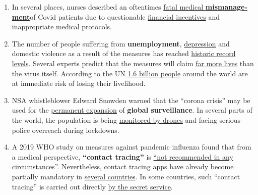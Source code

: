 \begin{enumerate}
{  seasons}, but many studies of a \textbf{``second wave''} are based on
  \href{https://www.heise.de/tp/features/Fellay-Studie-Zweite-Corona-Welle-4726303.html}{very
  unrealistic assumptions}, such as a constant risk of illness and death
  across all age groups.
\item
  In several places, nurses described an oftentimes
  \href{https://www.youtube.com/watch?v=UIDsKdeFOmQ}{fatal medical
  \textbf{mis­manage­ment}}of Covid patients due to questionable
  \href{https://www.usatoday.com/story/news/factcheck/2020/04/24/fact-check-medicare-hospitals-paid-more-covid-19-patients-coronavirus/3000638001/}{financial
  incentives} and inappropriate medical protocols.
\item
  The number of people suffering from \textbf{unemployment},
  \href{https://www.indystar.com/story/news/health/2020/04/03/coronavirus-indiana-how-get-help-mental-health-addiction/5104357002/}{depression}
  and domestic violence as a result of the measures has reached
  \href{https://www.businessinsider.com/us-weekly-jobless-claims-unemployment-filings-coronavirus-labor-market-layoffs-2020-5}{historic
  record levels}. Several experts predict that the measures will claim
  \href{https://www.nytimes.com/2020/03/20/opinion/coronavirus-pandemic-social-distancing.html}{far
  more lives} than the virus itself. According to the UN
  \href{https://www.theguardian.com/world/2020/apr/29/half-of-worlds-workers-at-immediate-risk-of-losing-livelihood-due-to-coronavirus}{1.6
  billion people} around the world are at immediate risk of losing their
  livelihood.
\item
  NSA whistleblower Edward Snowden warned that the ``corona crisis'' may
  be used for the
  \href{https://www.youtube.com/watch?v=-pcQFTzck_c}{permanent
  expansion} of \textbf{global surveillance}. In several parts of the
  world, the population is being
  \href{https://off-guardian.org/2020/04/25/50-headlines-darker-more-of-the-new-normal/}{monitored
  by drones} and facing serious police overreach during lockdowns.
\item
  A 2019 WHO study on measures against pandemic influenza found that
  from a medical perspective, \textbf{``contact tracing''} is
  \href{https://apps.who.int/iris/bitstream/handle/10665/329438/9789241516839-eng.pdf\#page=9}{``not
  recommended in any circumstances''}. Nevertheless, contact tracing
  apps have already
  \href{https://www.heise.de/tp/features/CuidAR-Argentinien-ueberwacht-mit-einer-App-4720143.html}{become}
  partially mandatory in
  \href{https://www.technologyreview.com/2020/05/07/1001360/india-aarogya-setu-covid-app-mandatory/}{several
  countries}. In some countries, such ``contact tracing'' is carried out
  directly
  \href{https://www.jewishpress.com/news/the-courts/state-to-high-court-even-more-shin-bet-involvement-in-fighting-the-coronavirus/2020/04/14/}{by
  the secret service}.
\end{enumerate}

